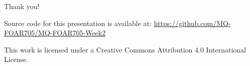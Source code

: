 \documentclass[aspectratio=169, 11pt]{beamer} %
\begin{document}
  
%   
%   


\begin{frame}{Thank you!}


Source code for this presentation is available at: \url{https://github.com/MQ-FOAR705/MQ-FOAR705-Week2}

This work is licensed under a Creative Commons Attribution 4.0 International License.

\end{frame}
\end{document}

